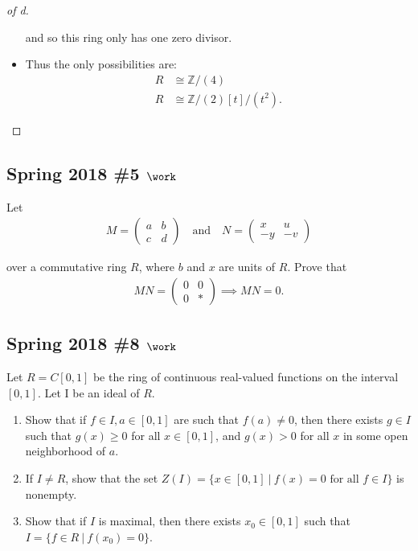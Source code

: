 \begin{solution}
\begin{proof}[of d]
\begin{itemize}
  and so this ring only has one zero divisor.
\item
  Thus the only possibilities are:
  \begin{align*}
  R &\cong {\mathbb{Z}}/(4) \\
  R &\cong {\mathbb{Z}}/(2)[t] / (t^2)
  .\end{align*}
\end{itemize}

\end{proof}

\end{solution}

\hypertarget{spring-2018-5-work}{%
\subsection{\texorpdfstring{Spring 2018 \#5
\(\work\)}{Spring 2018 \#5 \textbackslash work}}\label{spring-2018-5-work}}

Let
\begin{align*}
M=\left(\begin{array}{ll}{a} & {b} \\ {c} & {d}\end{array}\right)
\quad \text{and} \quad 
N=\left(\begin{array}{cc}{x} & {u} \\ {-y} & {-v}\end{array}\right)
\end{align*}

over a commutative ring \(R\), where \(b\) and \(x\) are units of \(R\).
Prove that
\begin{align*}
M N=\left(\begin{array}{ll}{0} & {0} \\ {0} & {*}\end{array}\right)
\implies MN = 0
.\end{align*}

\hypertarget{spring-2018-8-work}{%
\subsection{\texorpdfstring{Spring 2018 \#8
\(\work\)}{Spring 2018 \#8 \textbackslash work}}\label{spring-2018-8-work}}

Let \(R = C[0, 1]\) be the ring of continuous real-valued functions on
the interval \([0, 1]\). Let I be an ideal of \(R\).

\begin{enumerate}
\def\labelenumi{\alph{enumi}.}
\item
  Show that if \(f \in I, a \in [0, 1]\) are such that \(f (a) \neq 0\),
  then there exists \(g \in I\) such that \(g(x) \geq 0\) for all
  \(x \in [0, 1]\), and \(g(x) > 0\) for all \(x\) in some open
  neighborhood of \(a\).
\item
  If \(I \neq R\), show that the set
  \(Z(I) = \{x \in [0, 1] {~\mathrel{\Big|}~}f(x) = 0 \text{ for all } f \in I\}\)
  is nonempty.
\item
  Show that if \(I\) is maximal, then there exists \(x_0 \in [0, 1]\)
  such that \(I = \{ f \in R {~\mathrel{\Big|}~}f (x_0 ) = 0\}\).
\end{enumerate}

